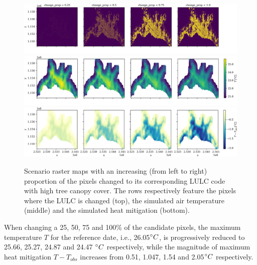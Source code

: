 \documentclass[10pt,letterpaper]{article}
\begin{document}
\begin{figure}
  \begin{adjustwidth}{-.4\textwidth}{0cm}
    \includegraphics[width=\linewidth]{figures/scenarios-prop-lulc.png}
    \includegraphics[width=\linewidth]{figures/scenarios-prop-T.png}
    \includegraphics[width=\linewidth]{figures/scenarios-prop-mitigation.png}
    \caption{\label{fig:scenarios-prop} Scenario raster maps with an increasing (from left to right) proportion of the pixels changed to its corresponding LULC code with high tree canopy cover. The rows respectively feature the pixels where the LULC is changed (top), the simulated air temperature (middle) and the simulated heat mitigation (bottom).}  
  \end{adjustwidth}
\end{figure}
When changing a 25, 50, 75 and 100\% of the candidate pixels, the maximum temperature $T$ for the reference date, i.e., 26.05$\degree C$, is progressively reduced to 25.66, 25.27, 24.87 and 24.47 $\degree C$ respectively, while the magnitude of maximum heat mitigation $T - T_{obs}$ increases from 0.51, 1.047, 1.54 and 2.05$\degree C$ respectively.
\end{document}
